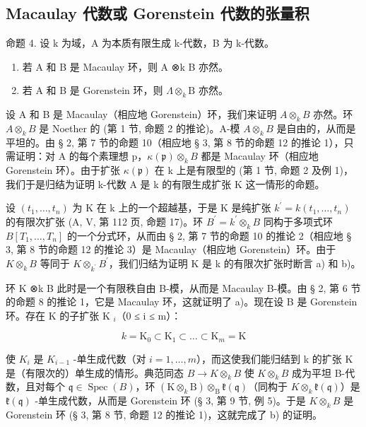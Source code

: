 \subsection{Macaulay 代数或 Gorenstein 代数的张量积}

命题 4. 设 k 为域，A 为本质有限生成 k-代数，B 为 k-代数。

\begin{enumerate}
\def\labelenumi{\alph{enumi})}
\item
  若 A 和 B 是 Macaulay 环，则 A ⊗k B 亦然。
\item
  若 A 和 B 是 Gorenstein 环，则 \(\Lambda\otimes_{k}\mathrm{B}\) 亦然。
\end{enumerate}

设 A 和 B 是 Macaulay（相应地 Gorenstein）环，我们来证明 \(A \otimes_{k} B\) 亦然。环 \(A \otimes_{k} B\) 是 Noether 的 (第 1 节, 命题 2 的推论)。A-模 \(A \otimes_{k} B\) 是自由的，从而是平坦的。由 § 2, 第 7 节的命题 10（相应地 § 3, 第 8 节的命题 12 的推论 1），只需证明：对 A 的每个素理想 p，\(\kappa(\mathfrak{p}) \otimes_{k} B\) 都是 Macaulay 环（相应地 Gorenstein 环）。由于扩张 \(\kappa(\mathfrak{p})\) 在 k 上是有限型的 (第 1 节, 命题 2 及例 1)，我们于是归结为证明 k-代数 A 是 k 的有限生成扩张 K 这一情形的命题。

设 \((t_{1},\ldots,t_{n})\) 为 K 在 k 上的一个超越基，于是 K 是纯扩张 \(k^{\prime}=k(t_{1},\ldots,t_{n})\) 的有限次扩张 (A, V, 第 112 页, 命题 17)。环 \(B^{\prime}=k^{\prime}\otimes_{k}B\) 同构于多项式环 \(B[T_{1},\ldots,T_{n}]\) 的一个分式环，从而由 § 2, 第 7 节的命题 10 的推论 2（相应地 § 3, 第 8 节的命题 12 的推论 3）是 Macaulay（相应地 Gorenstein）环。由于 \(K\otimes_{k}B\) 等同于 \(K\otimes_{k^{\prime}}B^{\prime}\)，我们归结为证明 K 是 k 的有限次扩张时断言 a) 和 b)。

环 K ⊗k B 此时是一个有限秩自由 B-模，从而是 Macaulay B-模。由 § 2, 第 6 节的命题 8 的推论 1，它是 Macaulay 环，这就证明了 a)。现在设 B 是 Gorenstein 环。存在 K 的子扩张 K \(_{i}\)（0 ≤ i ≤ m）：

\[
k = \mathrm{K} _ {0} \subset \mathrm{K} _ {1} \subset \dots \subset \mathrm{K} _ {m} = \mathrm{K}
\]

使 \(K_{i}\) 是 \(K_{i-1}\) -单生成代数（对 \(i = 1, \ldots, m\)），而这使我们能归结到 k 的扩张 K 是（有限次的）单生成的情形。典范同态 \(B \to K \otimes_{k} B\) 使 \(K \otimes_{k} B\) 成为平坦 B-代数，且对每个 \(\mathfrak{q} \in \operatorname{Spec}(B)\)，环 \((\mathrm{K} \otimes_{k} \mathrm{B}) \otimes_{\mathrm{B}} \mathfrak{k}(\mathfrak{q})\)（同构于 \(K \otimes_{k} \mathfrak{k}(\mathfrak{q})\)）是 \(\mathfrak{k}(\mathfrak{q})\) -单生成代数，从而是 Gorenstein 环 (§ 3, 第 9 节, 例 5)。于是 \(K \otimes_{k} B\) 是 Gorenstein 环 (§ 3, 第 8 节, 命题 12 的推论 1)，这就完成了 b) 的证明。

